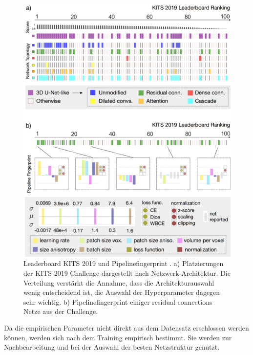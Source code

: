 \begin{figure}[H]
	
	\centering
	\includegraphics[scale=0.65]{Pictures/nnUnet/Bild05.png}
	\caption{Leaderboard KITS 2019 und Pipelinefingerprint \cite{nnunetPaperB}. a) Platzierungen der KITS 2019 Challenge \cite{KITS19Challenge} dargestellt nach Netzwerk-Architektur. Die Verteilung verstärkt die Annahme, dass die Architekturauswahl wenig entscheidend ist, die Auswahl der Hyperparameter dagegen sehr wichtig. b) Pipelinefingerprint einiger residual connections Netze aus der Challenge.}
	\label{pic:nnUnet_Pipelinefingerprint}
\end{figure}

Da die empirischen Parameter nicht direkt aus dem Datensatz erschlossen werden können, werden sich nach dem Training empirisch bestimmt. Sie werden zur Nachbearbeitung und bei der Auswahl der besten Netzstruktur genutzt. 

